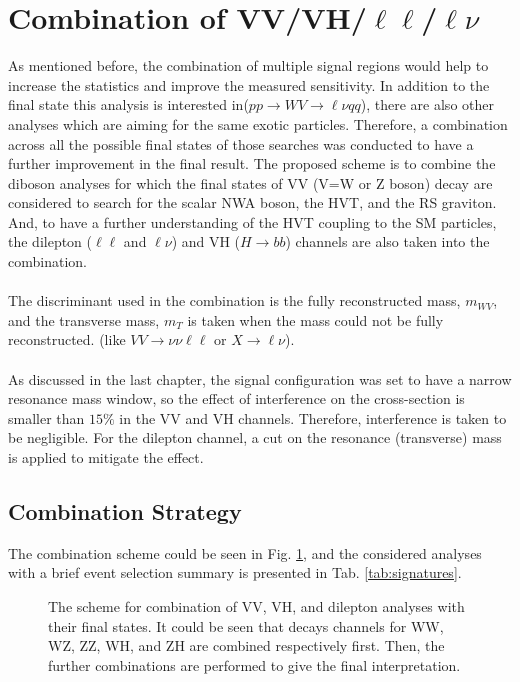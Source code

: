 \section{Combination of VV/VH/$\ell\ell$/$\ell\nu$}
As mentioned before, the combination of multiple signal regions would help to increase the statistics and improve the measured sensitivity.  In addition to the final state this analysis is interested in($pp\to WV \to \ell\nu qq$), there are also other analyses which are aiming for the same exotic particles. Therefore, a combination across all the possible final states of those searches was conducted to have a further improvement in the final result. The proposed scheme is to combine the diboson analyses for which the final states of VV (V=W or Z boson) decay are considered to search for the scalar NWA boson, the HVT, and the RS graviton. And, to have a further understanding of the HVT coupling to the SM particles, the dilepton ($\ell\ell$ and $\ell\nu$) and VH ($H\to bb$) channels are also taken into the combination.
\\
\\The discriminant used in the combination is the fully reconstructed mass, $m_{WV}$, and the transverse mass, $m_{T}$ is taken when the mass could not be fully reconstructed. (like $VV\to\nu\nu\ell\ell$ or $X\to\ell\nu$).
\\
\\As discussed in the last chapter, the signal configuration was set to have a narrow resonance mass window, so the effect of interference on the cross-section is smaller than $15\%$ in the VV and VH channels. Therefore, interference is taken to be negligible. For the dilepton channel, a cut on the resonance (transverse) mass is applied to mitigate the effect. \cite{EXOT-2018-01} 
\subsection{Combination Strategy}
The combination scheme could be seen in Fig. \ref{Fig:Comb_scheme}, and the considered analyses with a brief event selection summary is presented in Tab. \ref{tab:signatures}.
\begin{figure}[ht]
	\centering
	\caption{The scheme for combination of VV, VH, and dilepton analyses with their final states. It could be seen that decays channels for WW, WZ, ZZ, WH, and ZH are combined respectively first. Then, the further combinations are performed to give the final interpretation.}
	\label{Fig:Comb_scheme}
\end{figure}


